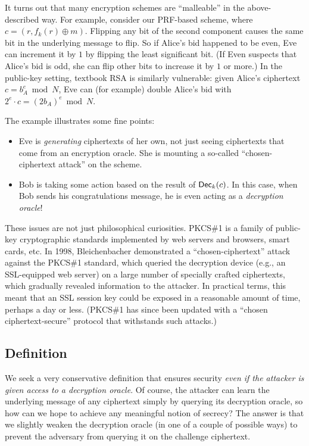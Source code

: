 \documentclass[11pt]{article}
\begin{document}
It turns out that many encryption schemes are ``malleable'' in the
above-described way.  For example, consider our PRF-based scheme,
where $c = (r , f_{k}(r) \oplus m)$.  Flipping any bit of the second
component causes the same bit in the underlying message to flip.  So
if Alice's bid happened to be even, Eve can increment it by $1$ by
flipping the least significant bit.  (If Even suspects that Alice's
bid is odd, she can flip other bits to increase it by $1$ or more.)
In the public-key setting, textbook RSA is similarly vulnerable: given
Alice's ciphertext $c = b_{A}^{e} \bmod N$, Eve can (for example)
double Alice's bid with $2^{e} \cdot c = (2b_{A})^{e} \bmod N$.

The example illustrates some fine points:
\begin{itemize}
\item Eve is \emph{generating} ciphertexts of her own, not just seeing
  ciphertexts that come from an encryption oracle.  She is mounting a
  so-called ``chosen-ciphertext attack'' on the scheme.
\item Bob is taking some action based on the result of
  $\mathsf{Dec}_{k}(c)$.  In this case, when Bob sends his congratulations
  message, he is even acting as a \emph{decryption oracle}!
\end{itemize}

These issues are not just philosophical curiosities.  PKCS\#1 is a
family of public-key cryptographic standards implemented by web
servers and browsers, smart cards, etc.  In 1998, Bleichenbacher
demonstrated a ``chosen-ciphertext'' attack against the PKCS\#1
standard, which queried the decryption device (e.g., an SSL-equipped
web server) on a large number of specially crafted ciphertexts, which
gradually revealed information to the attacker.  In practical terms,
this meant that an SSL session key could be exposed in a reasonable
amount of time, perhaps a day or less.  (PKCS\#1 has since been
updated with a ``chosen ciphertext-secure'' protocol that withstands
such attacks.)

\subsection{Definition}
\label{sec:cca-definition}

We seek a very conservative definition that ensures security
\emph{even if the attacker is given access to a decryption oracle}.
Of course, the attacker can learn the underlying message of any
ciphertext simply by querying its decryption oracle, so how can we
hope to achieve any meaningful notion of secrecy?  The answer is that
we slightly weaken the decryption oracle (in one of a couple of
possible ways) to prevent the adversary from querying it on the
challenge ciphertext.
\end{document}

